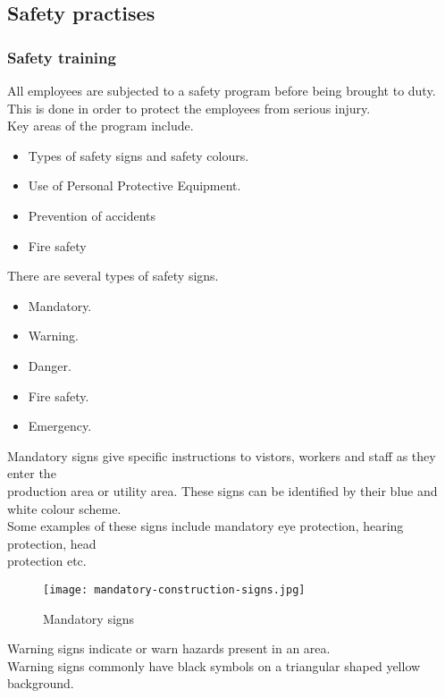 \documentclass[a4paper,12pt]{article}
\begin{document}
		\newpage
		\subsection{Safety practises}
			\subsubsection{Safety training}		
			All employees are subjected to a safety program before being brought to duty. \\
			This is done in order to protect the employees from serious injury. \\
			Key areas of the program include.
			\begin{itemize}
				\item	Types of safety signs and safety colours.
				\item	Use of Personal Protective Equipment.
				\item	Prevention of accidents 
				\item 	Fire safety						
			\end{itemize}
				
			There are several types of safety signs.
			\begin{itemize}
				\item Mandatory.
				\item Warning.
				\item Danger.
				\item Fire safety.
				\item Emergency.
			\end{itemize}
								 
			Mandatory signs give specific instructions to vistors, workers and staff as they enter the\\ production area or utility area.
			These signs can be identified by their blue and white colour scheme.\\
			Some examples of these signs include mandatory eye protection, hearing protection, head \\protection etc. 
			\begin{figure}[H]
				\begin{center}				
					\texttt{[image: mandatory-construction-signs.jpg]}
				\end{center}
				\caption{Mandatory signs}
				\label{fig:Mandatory signs}
			\end{figure} 
				
  			\newpage
			 Warning signs indicate or warn hazards present in an area.\\
			 Warning signs commonly have black symbols on a triangular shaped yellow background.
				 
\end{document}
